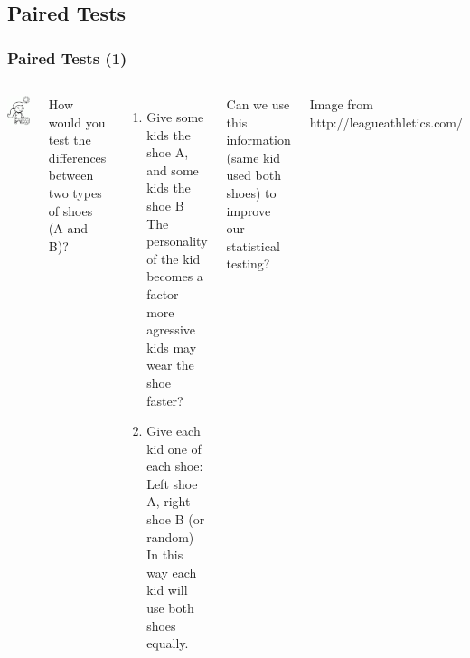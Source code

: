 \documentclass[10pt]{beamer}
\begin{document}
\subsection{Paired Tests}
\begin{frame}
  \frametitle{Paired Tests (1)}
  \begin{columns}[c]
    \includegraphics[width=1\textwidth]{img/soccer}
    \begin{block}{}
    How would you test the differences between two types of shoes (A and B)?
    \end{block}
    \begin{enumerate}
    \item Give some kids the shoe A, and some kids the shoe B\\ 
      {\small The personality of the kid becomes a factor -- more agressive
      kids may wear the shoe faster?}
    \item Give each kid one of each shoe: Left shoe A, right shoe B (or random)\\
      {\small In this way each kid will use both shoes equally.}
    \end{enumerate}
    \begin{block}{}
      Can we use this information (same kid used both shoes) to
      improve our statistical testing?
    \end{block}
    \vfill

    \hfill{\tiny Image from http://leagueathletics.com/}
  \end{columns}
\end{frame}
\end{document}
